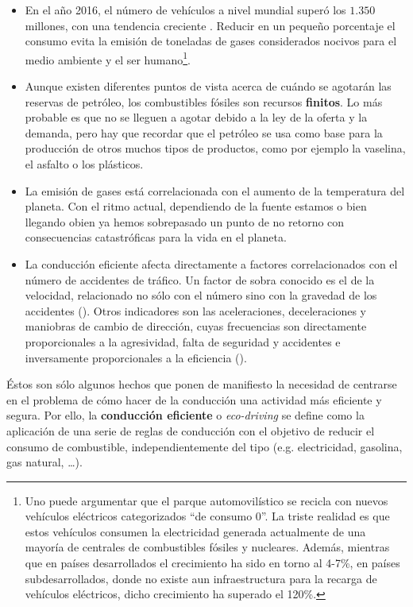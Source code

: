 \begin{itemize}
	\item En el año 2016, el número de vehículos a nivel mundial superó los $1.350$ millones, con una tendencia creciente \cite{oica2014motrate}. Reducir en un pequeño porcentaje el consumo evita la emisión de toneladas de gases considerados nocivos para el medio ambiente y el ser humano\footnote{Uno puede argumentar que el parque automovilístico se recicla con nuevos vehículos eléctricos categorizados \enquote{de consumo 0}. La triste realidad es que estos vehículos consumen la electricidad generada actualmente de una mayoría de centrales de combustibles fósiles y nucleares. Además, mientras que en países desarrollados el crecimiento ha sido en torno al 4-7\%, en países subdesarrollados, donde no existe aun infraestructura para la recarga de vehículos eléctricos, dicho crecimiento ha superado el 120\%.}.
	\item Aunque existen diferentes puntos de vista acerca de cuándo se agotarán las reservas de petróleo, los combustibles fósiles son recursos \textbf{finitos}. Lo más probable es que no se lleguen a agotar debido a la ley de la oferta y la demanda, pero hay que recordar que el petróleo se usa como base para la producción de otros muchos tipos de productos, como por ejemplo la vaselina, el asfalto o los plásticos.
	\item La emisión de gases está correlacionada con el aumento de la temperatura del planeta. Con el ritmo actual, dependiendo de la fuente estamos o bien llegando obien ya hemos sobrepasado un punto de no retorno con consecuencias catastróficas para la vida en el planeta.
	\item La conducción eficiente afecta directamente a factores correlacionados con el número de accidentes de tráfico. Un factor de sobra conocido es el de la velocidad, relacionado no sólo con el número sino con la gravedad de los accidentes (\cite{imprialou2016re}). Otros indicadores son las aceleraciones, deceleraciones y maniobras de cambio de dirección, cuyas frecuencias son directamente proporcionales a la agresividad, falta de seguridad y accidentes e inversamente proporcionales a la eficiencia (\cite{dingus2006100, lerner2010exploration}).
\end{itemize}

Éstos son sólo algunos hechos que ponen de manifiesto la necesidad de centrarse en el problema de cómo hacer de la conducción una actividad más eficiente y segura. Por ello, la \textbf{conducción eficiente} o \textit{eco-driving} se define como la aplicación de una serie de reglas de conducción con el objetivo de reducir el consumo de combustible, independientemente del tipo (e.g. electricidad, gasolina, gas natural, \ldots).

